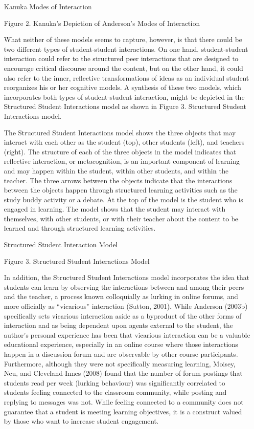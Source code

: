 \documentclass[
]{book}
\theoremstyle{definition}
\theoremstyle{definition}
\theoremstyle{definition}
\theoremstyle{definition}
\theoremstyle{remark}
\begin{document}
Kanuka Modes of Interaction

Figure 2. Kanuka's Depiction of Anderson's Modes of Interaction

What neither of these models seems to capture, however, is that there could be two different types of student-student interactions. On one hand, student-student interaction could refer to the structured peer interactions that are designed to encourage critical discourse around the content, but on the other hand, it could also refer to the inner, reflective transformations of ideas as an individual student reorganizes his or her cognitive models. A synthesis of these two models, which incorporates both types of student-student interaction, might be depicted in the Structured Student Interactions model as shown in Figure 3.
Structured Student Interactions model.

The Structured Student Interactions model shows the three objects that may interact with each other as the student (top), other students (left), and teachers (right). The structure of each of the three objects in the model indicates that reflective interaction, or metacognition, is an important component of learning and may happen within the student, within other students, and within the teacher. The three arrows between the objects indicate that the interactions between the objects happen through structured learning activities such as the study buddy activity or a debate. At the top of the model is the student who is engaged in learning. The model shows that the student may interact with themselves, with other students, or with their teacher about the content to be learned and through structured learning activities.

Structured Student Interaction Model

Figure 3. Structured Student Interactions Model

In addition, the Structured Student Interactions model incorporates the idea that students can learn by observing the interactions between and among their peers and the teacher, a process known colloquially as lurking in online forums, and more officially as ``vicarious'' interaction (Sutton, 2001). While Anderson (2003b) specifically sets vicarious interaction aside as a byproduct of the other forms of interaction and as being dependent upon agents external to the student, the author's personal experience has been that vicarious interaction can be a valuable educational experience, especially in an online course where those interactions happen in a discussion forum and are observable by other course participants. Furthermore, although they were not specifically measuring learning, Moisey, Neu, and Cleveland-Innes (2008) found that the number of forum postings that students read per week (lurking behaviour) was significantly correlated to students feeling connected to the classroom community, while posting and replying to messages was not. While feeling connected to a community does not guarantee that a student is meeting learning objectives, it is a construct valued by those who want to increase student engagement.
\end{document}
